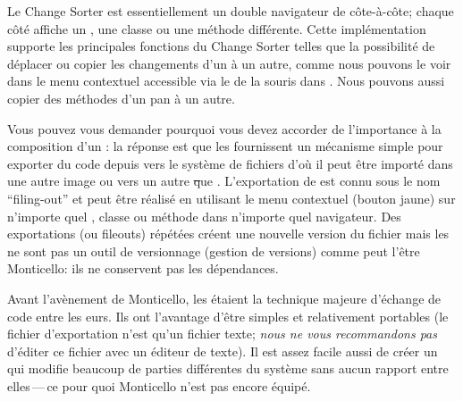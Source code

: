 \documentclass[a4paper,10pt,twoside]{book}
\begin{document}
Le Change Sorter est essentiellement un double navigateur de \changeset c\^ote-\`a-c\^ote;
chaque c\^ot\'e affiche un \changeset, une classe ou une m\'ethode diff\'erente.
Cette impl\'ementation supporte les principales fonctions du Change Sorter telles que
la possibilit\'e de d\'eplacer ou copier les changements d'un \changeset \`a un autre,
comme nous pouvons le voir dans le menu contextuel accessible via le 
de la souris dans .
Nous pouvons aussi copier des m\'ethodes d'un pan \`a un autre.

Vous pouvez vous demander pourquoi vous devez accorder de l'importance \`a la composition
d'un \changeset: la r\'eponse est que les \changesets fournissent un m\'ecanisme simple
pour exporter du code depuis \sq vers le syst\`eme de fichiers d'o\`u il peut
\^etre import\'e dans une autre image \sq ou vers un autre \st que \sq{}.
L'exportation de \changeset est connu sous le nom ``filing-out'' et peut \^etre r\'ealis\'e
en utilisant le menu contextuel (bouton jaune) sur n'importe quel \changeset, classe ou
m\'ethode dans n'importe quel navigateur.
Des exportations (ou fileouts) r\'ep\'et\'ees cr\'eent une nouvelle version du fichier
mais les \changesets ne sont pas un outil de versionnage (gestion de
versions) comme peut l'\^etre Monticello:
ils ne conservent pas les d\'ependances.

Avant l'av\`{e}nement de Monticello, les \changesets \'etaient la technique majeure d'\'echange de code entre les \sq{}eurs.
Ils ont l'avantage d'\^etre simples et relativement portables (le fichier d'exportation n'est qu'un fichier texte; 
\emph{nous ne vous recommandons pas} d'\'editer ce fichier avec un \'editeur de texte).
Il est assez facile aussi de cr\'eer un \changeset qui modifie
beaucoup de parties diff\'erentes du syst\`eme sans aucun rapport
entre elles\,---\,ce pour quoi Monticello n'est pas encore \'equip\'e.
\end{document}
